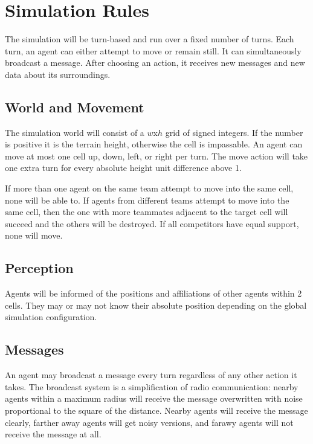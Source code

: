 \section{Simulation Rules}
\label{rules}

The simulation will be turn-based and run over a fixed number of turns. Each turn, an agent can either attempt to move or remain still. It can simultaneously broadcast a message. After choosing an action, it receives new messages and new data about its surroundings.

\subsection{World and Movement}

The simulation world will consist of a $w$x$h$ grid of signed integers. If the number is positive it is the terrain height, otherwise the cell is impassable. An agent can move at most one cell up, down, left, or right per turn. The move action will take one extra turn for every absolute height unit difference above 1.

If more than one agent on the same team attempt to move into the same cell, none will be able to. If agents from different teams attempt to move into the same cell, then the one with more teammates adjacent to the target cell will succeed and the others will be destroyed. If all competitors have equal support, none will move.

\subsection{Perception}

Agents will be informed of the positions and affiliations of other agents within 2 cells. They may or may not know their absolute position depending on the global simulation configuration.

\subsection{Messages}

An agent may broadcast a message every turn regardless of any other action it takes. The broadcast system is a simplification of radio communication: nearby agents within a maximum radius will receive the message overwritten with noise proportional to the square of the distance. Nearby agents will receive the message clearly, farther away agents will get noisy versions, and farawy agents will not receive the message at all.